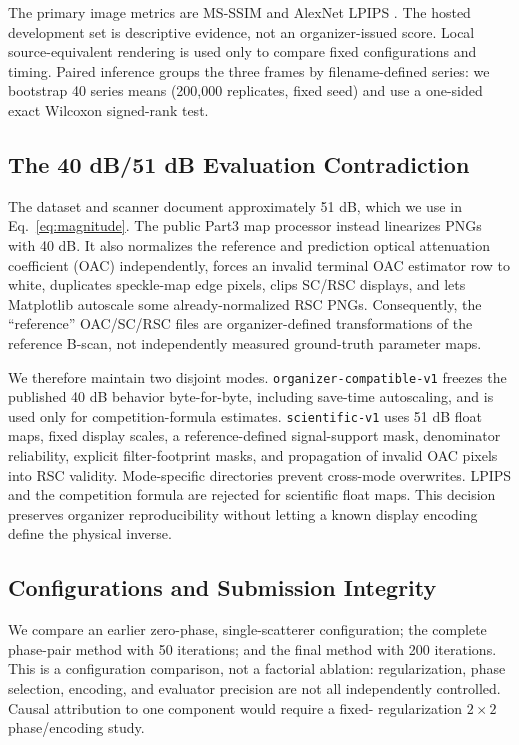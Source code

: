 \documentclass[runningheads]{llncs}
\newcommand{\ms}{MS-SSIM}
\begin{document}
The primary image metrics are \ms{} \cite{wang2003msssim} and AlexNet LPIPS
\cite{zhang2018lpips}. The hosted development set is descriptive evidence, not
an organizer-issued score. Local source-equivalent rendering is used only to
compare fixed configurations and timing. Paired inference groups the three
frames by filename-defined series: we bootstrap 40 series means (200,000
replicates, fixed seed) and use a one-sided exact Wilcoxon signed-rank test.

\subsection{The 40 dB/51 dB Evaluation Contradiction}

The dataset and scanner document approximately 51 dB, which we use in
Eq.~\ref{eq:magnitude}. The public Part3 map processor instead linearizes PNGs
with 40 dB. It also normalizes the reference and prediction optical attenuation
coefficient (OAC) independently, forces an invalid terminal OAC estimator row
to white, duplicates speckle-map edge pixels, clips SC/RSC displays, and lets
Matplotlib autoscale some already-normalized RSC PNGs. Consequently, the
``reference'' OAC/SC/RSC files are organizer-defined transformations of the
reference B-scan, not independently measured ground-truth parameter maps.

We therefore maintain two disjoint modes. \texttt{organizer-compatible-v1}
freezes the published 40 dB behavior byte-for-byte, including save-time
autoscaling, and is used only for competition-formula estimates.
\texttt{scientific-v1} uses 51 dB float maps, fixed display scales, a
reference-defined signal-support mask, denominator reliability, explicit
filter-footprint masks, and propagation of invalid OAC pixels into RSC
validity. Mode-specific directories prevent cross-mode overwrites. LPIPS and
the competition formula are rejected for scientific float maps. This decision
preserves organizer reproducibility without letting a known display encoding
define the physical inverse.

\subsection{Configurations and Submission Integrity}

We compare an earlier zero-phase, single-scatterer configuration; the complete
phase-pair method with 50 iterations; and the final method with 200 iterations.
This is a configuration comparison, not a factorial ablation: regularization,
phase selection, encoding, and evaluator precision are not all independently
controlled. Causal attribution to one component would require a fixed-
regularization $2\!\times\!2$ phase/encoding study.
\end{document}
